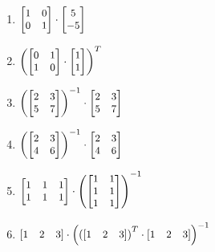 \documentclass{16384_doc}
\begin{document}
\begin{enumerate}[label=\textbf{Question \alph*},leftmargin=*, align=left]
\begin{enumerate}[label=(\roman*)]
        \item $\small \begin{bmatrix} 1 & 0 \\ 0 & 1 \end{bmatrix} \cdot \begin{bmatrix} 5 \\ -5 \end{bmatrix}$

        \item $\small \left(\begin{bmatrix} 0 & 1 \\ 1 & 0 \end{bmatrix} \cdot \begin{bmatrix} 1 \\ 1 \end{bmatrix}\right)^T$
        
        \item $\small \left(\begin{bmatrix} 2 & 3 \\ 5 & 7 \end{bmatrix}\right)^{-1} \cdot \begin{bmatrix} 2 & 3 \\ 5 & 7 \end{bmatrix}$


       \item $\small \left(\begin{bmatrix} 2 & 3 \\ 4 & 6 \end{bmatrix}\right)^{-1} \cdot \begin{bmatrix} 2 & 3 \\ 4 & 6 \end{bmatrix}$
        
        \item $\small \begin{bmatrix} 1 & 1 & 1 \\ 1 & 1 & 1 \end{bmatrix} \cdot \left(\begin{bmatrix} 1 & 1 \\ 1 & 1 \\ 1 & 1 \end{bmatrix}\right)^{-1}$
        
        \item $\small \begin{bmatrix} 1 & 2 & 3 \end{bmatrix} \cdot \left(\left(\begin{bmatrix} 1 & 2 & 3 \end{bmatrix}\right)^T \cdot \begin{bmatrix} 1 & 2 & 3 \end{bmatrix}\right)^{-1}$
        

\end{enumerate}
\end{enumerate}
\end{document}
